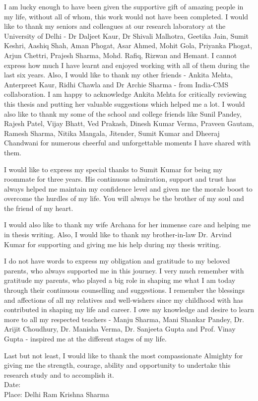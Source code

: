I am lucky enough to have been given the supportive gift of amazing people in my life, without all of whom, this work would not have been completed. I would like to thank my seniors and colleagues at our research laboratory at the University of Delhi - Dr Daljeet Kaur, Dr Shivali Malhotra, Geetika Jain, Sumit Keshri, Aashiq Shah, Aman Phogat, Asar Ahmed, Mohit Gola, Priyanka Phogat, Arjun Chettri, Prajesh Sharma, Mohd. Rafiq, Rizwan and Hemant. I cannot express how much I have learnt and enjoyed working with all of them during the last six years. Also, I would like to thank my other friends - Ankita Mehta, Anterpreet Kaur, Ridhi Chawla and Dr Archie Sharma - from India-CMS collaboration.
I am happy to acknowledge Ankita Mehta for critically reviewing this thesis and putting her valuable suggestions which helped me a lot. 
I would also like to thank my some of the school and college friends like Sunil Pandey, Rajesh Patel, Vijay Bhatt, Ved Prakash, Dinesh Kumar Verma, Praveen Gautam, Ramesh Sharma, Nitika Mangala, Jitender, Sumit Kumar and Dheeraj Chandwani for numerous cheerful and unforgettable moments I have shared with them.

I would like to express my special thanks to Sumit Kumar for being my roommate for three years. His continuous admiration, support and trust has always helped me maintain my confidence level and given me the morale boost to overcome the hurdles of my life. You will always be the brother of my soul and the friend of my heart.

I would also like to thank my wife Archana for her immense care and helping me in thesis writing. Also, I would like to thank my brother-in-law Dr. Arvind Kumar for supporting and giving me his help during my thesis writing.

I do not have words to express my obligation and gratitude to my beloved parents, who always supported me in this journey. I very much remember with gratitude my parents, who played a big role in shaping me what I am today through their continuous counselling and suggestions. I remember the blessings and affections of all my relatives and well-wishers since my childhood with has contributed in shaping my life and career. I owe my knowledge and desire to learn more to all my respected teachers - Manju Sharma, Mani Shankar Pandey, Dr. Arijit Choudhury, Dr. Manisha Verma, Dr. Sanjeeta Gupta and Prof. Vinay Gupta - inspired me at the different stages of my life.

Last but not least, I would like to thank the most compassionate Almighty for giving me the strength, courage, ability and opportunity to undertake this research study and to accomplish it.\\[3.0cm]
Date:\\
Place: Delhi \hfill Ram Krishna Sharma
